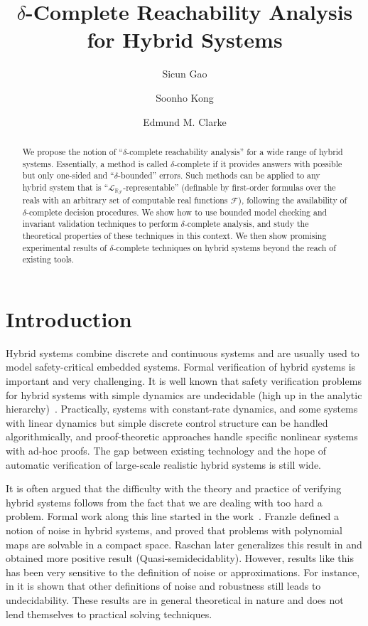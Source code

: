 \documentclass[envcountsect]{llncs}
\title{$\delta$-Complete Reachability Analysis for Hybrid Systems}
\author{Sicun Gao \and Soonho Kong \and Edmund M. Clarke}
\institute{Carnegie Mellon University, Pittsburgh, PA 15213}
\newcommand{\lrf}{\mathcal{L}_{\mathbb{R}_{\mathcal{F}}}}
\begin{document}
\maketitle

\begin{abstract}
We propose the notion of ``$\delta$-complete reachability analysis'' for a wide range of hybrid systems. Essentially, a method is called $\delta$-complete if it provides answers with possible but only one-sided  and ``$\delta$-bounded'' errors. Such methods can be applied to any hybrid system that is ``$\lrf$-representable'' (definable by first-order formulas over the reals with an arbitrary set of computable real functions $\mathcal{F}$), following the availability of $\delta$-complete decision procedures. We show how to use bounded model checking and invariant validation techniques to perform $\delta$-complete analysis, and study the theoretical properties of these techniques in this context. We then show promising experimental results of $\delta$-complete techniques on hybrid systems beyond the reach of existing tools. 
\end{abstract}

\section{Introduction}

Hybrid systems combine discrete and continuous systems and are usually used to model safety-critical embedded systems. Formal verification of hybrid systems is important and very challenging. It is well known that safety verification problems for hybrid systems with simple dynamics are undecidable (high up in the analytic hierarchy)~\cite{}. Practically, systems with constant-rate dynamics, and some systems with linear dynamics but simple discrete control structure can be handled algorithmically, and proof-theoretic approaches handle specific nonlinear systems with ad-hoc proofs. The gap between existing technology and the hope of automatic verification of large-scale realistic hybrid systems is still wide. 

It is often argued that the difficulty with the theory and practice of verifying hybrid systems follows from the fact that we are dealing with too hard a problem. Formal work along this line started in the work~\cite{}. Franzle defined a notion of noise in hybrid systems, and proved that problems with polynomial maps are solvable in a compact space. Raschan later generalizes this result in \cite{} and obtained more positive result (Quasi-semidecidablity). However, results like this has been very sensitive to the definition of noise or approximations. For instance, in \cite{} it is shown that other definitions of noise and robustness still leads to undecidability. These results are in general theoretical in nature and does not lend themselves to practical solving techniques. 
\end{document}
